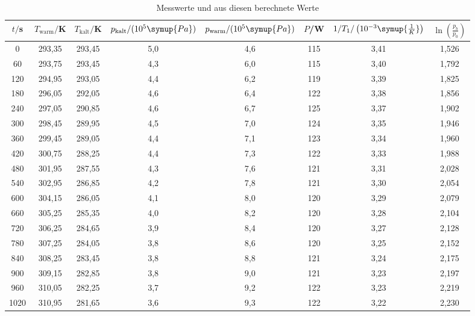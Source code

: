 \begin{table}
  \centering
  \caption{Messwerte und aus diesen berechnete Werte}
  \label{tab:messwerte}
  \begin{tabular}{c c c c c c c c}
    \toprule
    $t/$s & $T_{\text{warm}}/$K & $T_{\text{kalt}}/$K & $p_{\text{kalt}}/(10^{5}\symup{Pa})$ & $p_{\text{warm}}/(10^{5}\symup{Pa})$ &
    $P$/W & $1/T_1/\left(10^{-3}\symup{\frac{1}{K}}\right)$ & $\ln\left(\frac{p_b}{p_0}\right)$ \\
    \midrule
    0	    &  293,35	 & 	293,45 	&	 5,0	&  4,6   &  115  &  3,41	&   1,526  \\
    60    &	 293,75  & 	293,45 	&	 4,3	&  6,0   & 	115	 &  3,40 	&   1,792  \\
    120   &	 294,95  & 	293,05	&	 4,4	&  6,2   & 	119  &	3,39 	&   1,825 \\
    180	  &  296,05  & 	292,05	&	 4,6	&  6,4   & 	122	 &  3,38 	&   1,856  \\
    240	  &  297,05  & 	290,85	&	 4,6	&  6,7	 &  125	 &  3,37 	&   1,902 \\
    300	  &  298,45  & 	289,95	&	 4,5	&  7,0	 &  124  &	3,35	&   1,946 \\
    360	  &  299,45  & 	289,05	&	 4,4	&  7,1 	 &  123	 &  3,34	&   1,960 \\
    420	  &  300,75  & 	288,25	&	 4,4	&  7,3	 &  122  &	3,33	&   1,988 \\
    480	  &  301,95  & 	287,55	&	 4,3	&  7,6 	 &  121	 &  3,31	&   2,028 \\
    540	  &  302,95  & 	286,85	&	 4,2	&  7,8 	 &  121  &	3,30	&   2,054  \\
    600   &	 304,15  & 	286,05	&	 4,1	&  8,0	 &  120	 &  3,29	&   2,079  \\
    660   &	 305,25  & 	285,35	&	 4,0	&  8,2 	 &  120	 &  3,28	&   2,104 \\
    720   &	 306,25  & 	284,65	&	 3,9	&  8,4	 &  120  &	3,27	&   2,128 \\
    780   &	 307,25  &	284,05	&	 3,8	&  8,6 	 &  120  & 	3,25	&   2,152  \\
    840   &	 308,25  & 	283,45	&	 3,8	&  8,8 	 &  121  &	3,24	&   2,175  \\
    900   &	 309,15  &	282,85	&	 3,8	&  9,0 	 &  121  &  3,23	&   2,197  \\
    960   &	 310,05  &  282,25	&	 3,7	&  9,2 	 &  122  &  3,23	&   2,219 \\
    1020  &	 310,95  &  281,65	&	 3,6	&  9,3 	 &  122  &  3,22	&   2,230 \\

\end{tabular}
\end{table}
